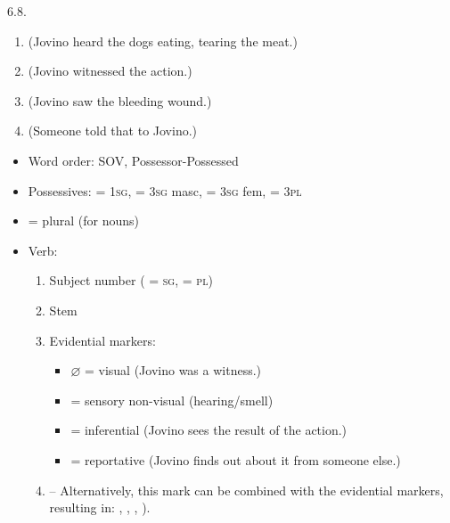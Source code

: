 \begin{refsection}
\begin{practiceproblemsolution}{6.8. \langnameTariana}
\begin{solutions}[label=Solution 6.8\alph*]
\begin{enumerate}[start = 17]
        \item {} (Jovino heard the dogs eating, tearing the meat.)
        \item {} (Jovino witnessed the action.)
        \item {} (Jovino saw the bleeding wound.)
        \item {} (Someone told that to Jovino.)
    \end{enumerate}
\end{solutions}

\begin{itemize}
    \item Word order: SOV, Possessor-Possessed
    \item Possessives:  = 1\textsc{sg},  = 3\textsc{sg} masc,  = 3\textsc{sg} fem,  = 3\textsc{pl}
    \item {} = plural (for nouns)
    \item Verb:
    \begin{enumerate}

        \item Subject number ( = \textsc{sg},  = \textsc{pl})
        \item Stem
        \item Evidential markers:
        \begin{itemize}

            \item $\varnothing$ = visual (Jovino was a witness.)
            \item {} = sensory non-visual (hearing/smell)
            \item {} = inferential (Jovino sees the result of the action.)
            \item\sloppy {} = reportative (Jovino finds out about it from someone else.)
        \end{itemize}
        \item {} -- Alternatively, this mark can be combined with the evidential markers, resulting in: , , , ).
    \end{enumerate}
\end{itemize}
\end{practiceproblemsolution}


\end{refsection}
